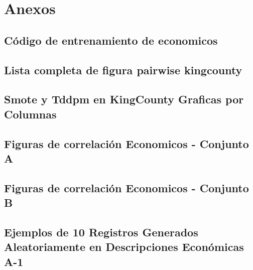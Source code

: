 \chapter{Anexos}

\section{Código de entrenamiento de economicos}



\section{Lista completa de figura pairwise kingcounty}
\label{A-pairwise-kingcounty-top2-a-1}


\section{Smote y Tddpm en KingCounty Graficas por Columnas}



\section{Figuras de correlación Economicos - Conjunto A}
\label{pairwise-full-a}



\section{Figuras de correlación Economicos - Conjunto B}
\label{pairwise-full-a}


%

\section{Ejemplos de 10 Registros Generados Aleatoriamente en Descripciones Económicas A-1}
\label{ejemplo-10-aleatoreos-a}


